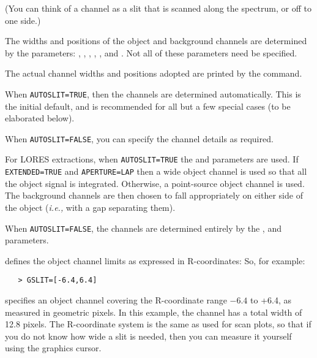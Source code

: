 (You can think of a channel as a slit that is scanned along the spectrum,
or off to one side.\@)

The widths and positions of the object and background channels are determined
by the parameters: ,
, ,
, ,
 and \@.  Not
all of these parameters need be specified.

The actual channel widths and positions adopted are printed by the
 command.

When \verb+AUTOSLIT=TRUE+, then the channels are determined
automatically.  This is the initial default, and is recommended for all but
a few special cases (to be elaborated below)\@.

When \verb+AUTOSLIT=FALSE+, you can specify the channel details as required.

For LORES extractions, when \verb+AUTOSLIT=TRUE+ the
 and  
parameters are used.  If \verb+EXTENDED=TRUE+ and \verb+APERTURE=LAP+ then a
wide object channel is used so that all the object signal is integrated.
Otherwise, a point-source object channel is used.  The background channels are
then chosen to fall appropriately on either side of the object ({\it{i.e.,}}
with a gap separating them)\@.

When \verb+AUTOSLIT=FALSE+, the channels are determined entirely by the
,  and
 parameters.

 defines the object channel limits as expressed in
R-coordinates: So, for example:

\begin{verbatim}
   > GSLIT=[-6.4,6.4]
\end{verbatim}

\begin{latexonly}
specifies an object channel covering the R-coordinate range $-6.4$ to +6.4,
as measured in geometric pixels.  In this example, the channel has a total
width of 12.8 pixels.  The R-coordinate system is the same as used for
scan plots, so that if you do not know how wide a slit is needed, then you can
measure it yourself using the graphics cursor.
\end{latexonly}

